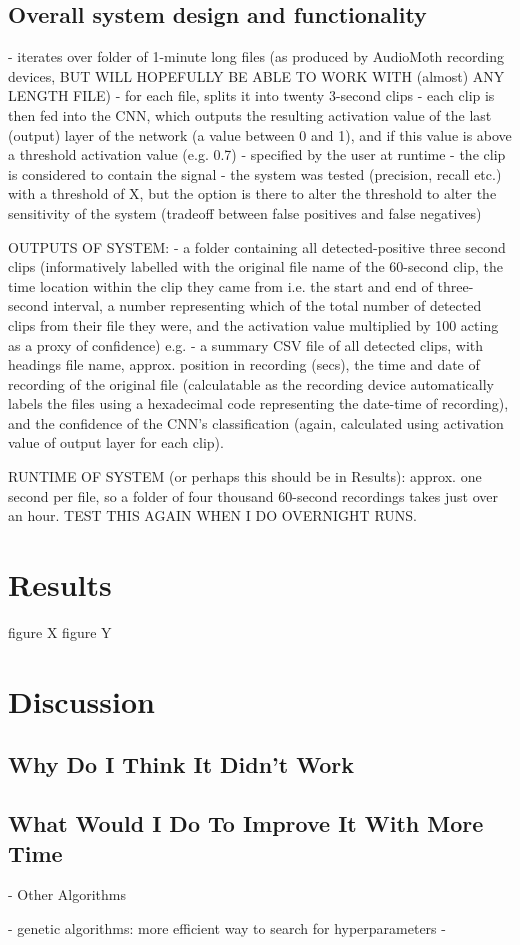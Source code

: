 \documentclass[11pt]{article}
\begin{document}
\subsection{Overall system design and functionality}
- iterates over folder of 1-minute long files (as produced by AudioMoth recording devices, BUT WILL HOPEFULLY BE ABLE TO WORK WITH (almost) ANY LENGTH FILE)
- for each file, splits it into twenty 3-second clips 
- each clip is then fed into the CNN, which outputs the resulting activation value of the last (output) layer of the network (a value between 0 and 1), and if this value is above a threshold activation value (e.g. 0.7) - specified by the user at runtime - the clip is considered to contain the signal 
- the system was tested (precision, recall etc.) with a threshold of X, but the option is there to alter the threshold to alter the sensitivity of the system (tradeoff between false positives and false negatives)

OUTPUTS OF SYSTEM:
- a folder containing all detected-positive three second clips (informatively labelled with the original file name of the 60-second clip, the time location within the clip they came from i.e. the start and end of three-second interval, a number representing which of the total number of detected clips from their file they were, and the activation value multiplied by 100 acting as a proxy of confidence) e.g. 
- a summary CSV file of all detected clips, with headings file name, approx. position in recording (secs), the time and date of recording of the original file (calculatable as the recording device automatically labels the files using a hexadecimal code representing the date-time of recording), and the confidence of the CNN's classification (again, calculated using activation value of output layer for each clip). 

RUNTIME OF SYSTEM (or perhaps this should be in Results): approx. one second per file, so a folder of four thousand 60-second recordings takes just over an hour. TEST THIS AGAIN WHEN I DO OVERNIGHT RUNS.

\section{Results}
figure X
figure Y

\section{Discussion}

\subsection{Why Do I Think It Didn't Work}
\subsection{What Would I Do To Improve It With More Time}
- Other Algorithms

- genetic algorithms: more efficient way to search for hyperparameters 
- 
\end{document}
